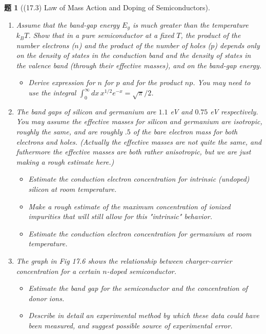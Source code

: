 \documentclass[UTF8,10pt,a4paper]{article}
\theoremstyle{Problem}
\newtheorem{prob}{题}
\theoremstyle{Solution}
\begin{document}
\begin{prob}[(17.3) Law of Mass Action and Doping of Semiconductors]
    \begin{enumerate}
        \item[(a)] Assume that the band-gap energy $E_g$ is much greater than the temperature $k_BT$. Show that in a pure semiconductor at a fixed $T$, the product of the number electrons ($n$) and the product of the number of holes ($p$) depends only on the density of states in the conduction band and the density of states in the valence band (through their effective masses), and on the band-gap energy.
        \begin{itemize}
            \item[$\triangleright$] Derive expression for $n$ for $p$ and for the product $np$. You may need to use the integral $\int_0^{\infty}dx\,x^{1/2}e^{-x}=\sqrt{\pi}/2$.
        \end{itemize}
        \item[(b)] The band gaps of silicon and germanium are $1.1$ eV and $0.75$ eV respectively. You may assume the effective masses for silicon and germanium are isotropic, roughly the same, and are roughly $.5$ of the bare electron mass for both electrons and holes. (Actually the effective masses are not quite the same, and futhermore the effective masses are both rather anisotropic, but we are just making a rough estimate here.)
        \begin{itemize}
            \item[$\triangleright$] Estimate the conduction electron concentration for intrinsic (undoped) silicon at room temperature.
            \item[$\triangleright$] Make a rough estimate of the maximum concentration of ionized impurities that will still allow for this "intrinsic" behavior.
            \item[$\triangleright$] Estimate the conduction electron concentration for germanium at room temperature.
        \end{itemize}
        \item[(c)] The graph in Fig 17.6 shows the relationship between charger-carrier concentration for a certain $n$-doped semiconductor.
        \begin{itemize}
            \item[$\triangleright$] Estimate the band gap for the semiconductor and the concentration of donor ions.
            \item[$\triangleright$] Describe in detail an experimental method by which these data could have been measured, and suggest possible source of experimental error.

\end{itemize}
\end{enumerate}
\end{prob}
\end{document}
